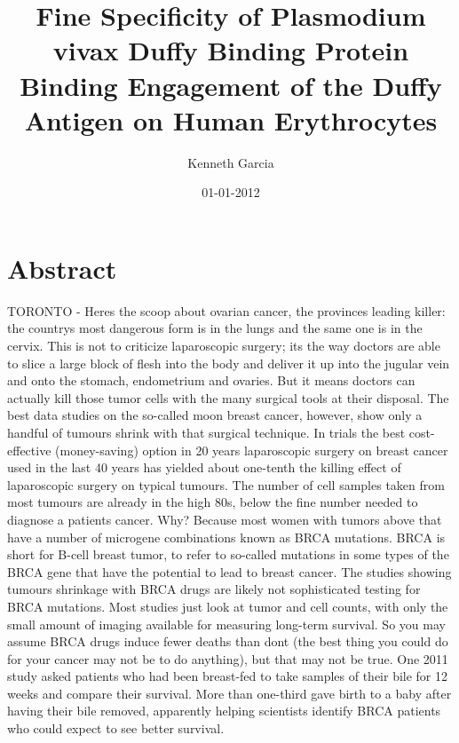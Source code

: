 \documentclass{article}%
\title{Fine Specificity of Plasmodium vivax Duffy Binding Protein Binding Engagement of the Duffy Antigen on Human Erythrocytes}%
\author{Kenneth Garcia}%
\affil{Department of Emergency and Organ Transplantation, University of Bari, Bari, Italy, \newline%
    C.A.R.S.O. Consortium, Valenzano, Bari, Italy, \newline%
    Department of Science, Biological and Environmental Sciences and Technologies, University of Salento, Lecce, Italy}%
\date{01{-}01{-}2012}%
\begin{document}
%
\normalsize%
\maketitle%
\section{Abstract}%
\label{sec:Abstract}%
TORONTO {-} Heres the scoop about ovarian cancer, the provinces leading killer: the countrys most dangerous form is in the lungs and the same one is in the cervix.\newline%
This is not to criticize laparoscopic surgery; its the way doctors are able to slice a large block of flesh into the body and deliver it up into the jugular vein and onto the stomach, endometrium and ovaries. But it means doctors can actually kill those tumor cells with the many surgical tools at their disposal.\newline%
The best data studies on the so{-}called moon breast cancer, however, show only a handful of tumours shrink with that surgical technique. In trials  the best cost{-}effective (money{-}saving) option in 20 years  laparoscopic surgery on breast cancer used in the last 40 years has yielded about one{-}tenth the killing effect of laparoscopic surgery on typical tumours.\newline%
The number of cell samples taken from most tumours are already in the high 80s, below the fine number needed to diagnose a patients cancer. Why? Because most women with tumors above that have a number of microgene combinations known as BRCA mutations. BRCA is short for B{-}cell breast tumor, to refer to so{-}called mutations in some types of the BRCA gene that have the potential to lead to breast cancer.\newline%
The studies showing tumours shrinkage with BRCA drugs are likely not sophisticated testing for BRCA mutations.\newline%
Most studies just look at tumor and cell counts, with only the small amount of imaging available for measuring long{-}term survival.\newline%
So you may assume BRCA drugs induce fewer deaths than dont (the best thing you could do for your cancer may not be to do anything), but that may not be true. One 2011 study asked patients who had been breast{-}fed to take samples of their bile for 12 weeks and compare their survival. More than one{-}third gave birth to a baby after having their bile removed, apparently helping scientists identify BRCA patients who could expect to see better survival.\newline%
\end{document}
